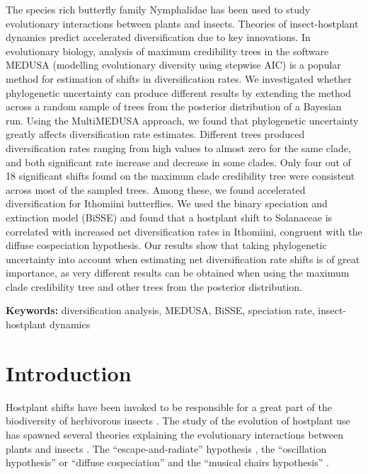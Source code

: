 \documentclass[10pt]{article}
\begin{document}
The species rich butterfly family Nymphalidae has been used to study
evolutionary interactions between plants and insects. Theories of
insect-hostplant dynamics predict accelerated diversification due to key
innovations. In evolutionary biology, analysis of maximum credibility
trees in the software MEDUSA (modelling evolutionary diversity using
stepwise AIC) is a popular method for estimation of shifts in
diversification rates. We investigated whether phylogenetic uncertainty
can produce different results by extending the method across a random
sample of trees from the posterior distribution of a Bayesian run. Using
the MultiMEDUSA approach, we found that phylogenetic uncertainty greatly
affects diversification rate estimates. Different trees produced
diversification rates ranging from high values to almost zero for the
same clade, and both significant rate increase and decrease in some
clades. Only four out of 18 significant shifts found on the maximum
clade credibility tree were consistent across most of the sampled trees.
Among these, we found accelerated diversification for Ithomiini
butterflies. We used the binary speciation and extinction model (BiSSE)
and found that a hostplant shift to Solanaceae is correlated with
increased net diversification rates in Ithomiini, congruent with the
diffuse cospeciation hypothesis. Our results show that taking
phylogenetic uncertainty into account when estimating net
diversification rate shifts is of great importance, as very different
results can be obtained when using the maximum clade credibility tree
and other trees from the posterior distribution.

\textbf{Keywords:} diversification analysis, MEDUSA, BiSSE, speciation
rate, insect-hostplant dynamics

\section*{Introduction}

Hostplant shifts have been invoked to be responsible for a great part of
the biodiversity of herbivorous insects \cite{mitter1988}. The study of the
evolution of hostplant use has spawned several theories explaining the
evolutionary interactions between plants and insects \cite{nyman2012}. The
``escape-and-radiate'' hypothesis \cite{ehrlich1964}, the ``oscillation
hypothesis'' \cite{janz2011, nylin2014} or ``diffuse cospeciation'' \cite{nyman2012} and the
``musical chairs hypothesis'' \cite{hardy2014}.
\end{document}
